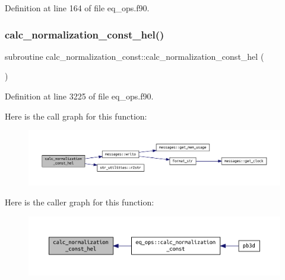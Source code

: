 Definition at line 164 of file eq\+\_\+ops.\+f90.

\mbox{\label{eq__ops_8f90_af011b33f043fd8732eeea7d9f2e03ea3}} 
\subsubsection{\texorpdfstring{calc\+\_\+normalization\+\_\+const\+\_\+hel()}{calc\_normalization\_const\_hel()}}
{\footnotesize\ttfamily subroutine calc\+\_\+normalization\+\_\+const\+::calc\+\_\+normalization\+\_\+const\+\_\+hel (\begin{DoxyParamCaption}{ }\end{DoxyParamCaption})}



Definition at line 3225 of file eq\+\_\+ops.\+f90.

Here is the call graph for this function\+:
\nopagebreak
\begin{figure}[H]
\begin{center}
\leavevmode
\includegraphics[width=350pt]{eq__ops_8f90_af011b33f043fd8732eeea7d9f2e03ea3_cgraph}
\end{center}
\end{figure}
Here is the caller graph for this function\+:
\nopagebreak
\begin{figure}[H]
\begin{center}
\leavevmode
\includegraphics[width=350pt]{eq__ops_8f90_af011b33f043fd8732eeea7d9f2e03ea3_icgraph}
\end{center}
\end{figure}
\mbox{\label{eq__ops_8f90_a26984870bf6ddccfc7c55bdf5993a4d8}} 
